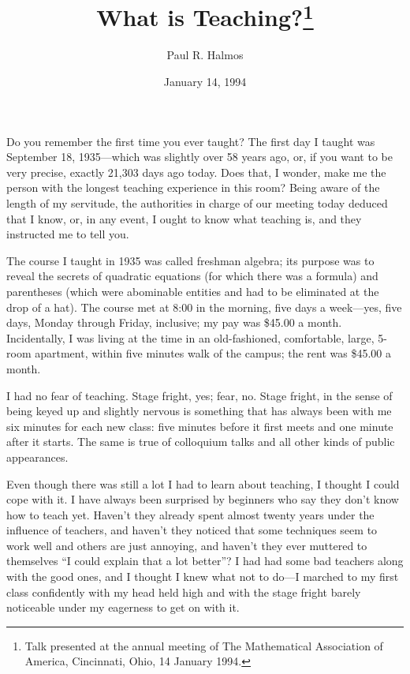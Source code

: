 \documentclass[a4paper,12pt]{article}
\author{Paul R. Halmos}
\date{January 14, 1994}
\title{What is Teaching?\footnote{Talk presented at the annual meeting of The Mathematical Association of America, Cincinnati,
Ohio, 14 January 1994.}}
\begin{document}
\maketitle

Do you remember the first time you ever taught?  The first day I taught
was September 18, 1935—which was slightly over 58 years ago, or, if you
want to be very precise, exactly 21,303 days ago today.  Does that, I
wonder, make me the person with the longest teaching experience in this
room?  Being aware of the length of my servitude, the authorities in
charge of our meeting today deduced that I know, or, in any event, I
ought to know what teaching is, and they instructed me to tell you.

The course I taught in 1935 was called freshman algebra; its purpose
was to reveal the secrets of quadratic equations (for which there was
a formula) and parentheses (which were abominable entities and had to
be eliminated at the drop of a hat).  The course met at 8:00 in the
morning, five days a week—yes, five days, Monday through Friday,
inclusive; my pay was \$45.00 a month.  Incidentally, I was living at
the time in an old-fashioned, comfortable, large, 5-room apartment,
within five minutes walk of the campus; the rent was \$45.00 a month.

I had no fear of teaching.  Stage fright, yes; fear, no.  Stage fright,
in the sense of being keyed up and slightly nervous is something that
has always been with me six minutes for each new class: five minutes
before it first meets and one minute after it starts.  The same is true
of colloquium talks and all other kinds of public appearances.

Even though there was still a lot I had to learn about teaching, I
thought I could cope with it.  I have always been surprised by beginners
who say they don’t know how to teach yet.  Haven’t they already spent
almost twenty years under the influence of teachers, and haven’t they
noticed that some techniques seem to work well and others are just
annoying, and haven’t they ever muttered to themselves “I could explain
that a lot better”?  I had had some bad teachers along with the good
ones, and I thought I knew what not to do—I marched to my first class
confidently with my head held high and with the stage fright barely
noticeable under my eagerness to get on with it.
\end{document}
